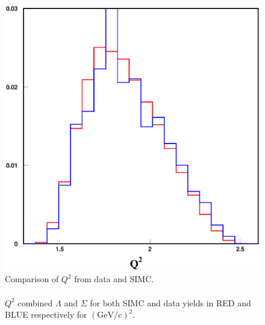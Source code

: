 \begin{figure}[!tbp]
  \centering
  \includegraphics[width=0.8\columnwidth]{com_plot_2_Q2_2}
  \caption[Comparison of $Q^2$ from data and SIMC.]{\label{fig:com_plot_2_Q2_2}Comparison of $Q^2$ from data and SIMC.\\\\ $Q^2$ combined $\Lambda$ and $\Sigma$ for both SIMC and data yields in RED and BLUE respectively for $(\mathrm{GeV/c})^2$.}
\end{figure}


